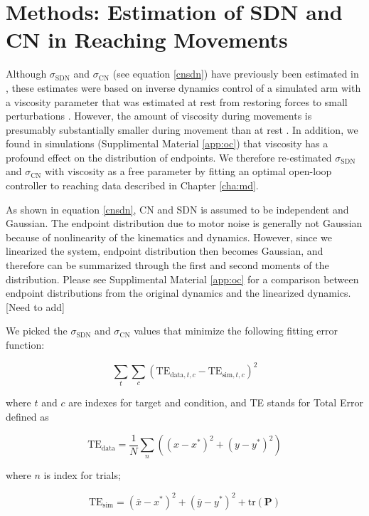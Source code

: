 \section{Methods: Estimation of SDN and CN in Reaching Movements}
Although $\sigma_{\text{SDN}}$ and $\sigma_{\text{CN}}$ (see equation \ref{cnsdn}) have previously been estimated in \cite{VanBeers2004}, these estimates were based on inverse dynamics control of a simulated arm with a viscosity parameter that was estimated at rest from restoring forces to small perturbations \cite{Gomi1998}. 
However, the amount of viscosity during movements is presumably substantially smaller during movement than at rest \cite{Burdet2013}. 
In addition, we found in simulations (Supplimental Material \ref{app:oc}) that viscosity has a profound effect on the distribution of endpoints.  
We therefore re-estimated $\sigma_{\text{SDN}}$ and $\sigma_{\text{CN}}$ with viscosity as a free parameter by fitting an optimal open-loop controller to reaching data described in Chapter \ref{cha:md}.

As shown in equation \ref{cnsdn}, CN and SDN is assumed to be independent and Gaussian. 
The endpoint distribution due to motor noise is generally not Gaussian because of nonlinearity of the kinematics and dynamics.
However, since we linearized the system, endpoint distribution then becomes Gaussian, and therefore can be summarized through the first and second moments of the distribution. 
Please see Supplimental Material \ref{app:oc} for a comparison between endpoint distributions from the original dynamics and the linearized dynamics.[Need to add]

We picked the $\sigma_{\text{SDN}}$ and $\sigma_{\text{CN}}$ values that minimize the following fitting error function:

\begin{equation}
\sum_{t}\sum_{c} (\text{TE}_{\text{data},t,c} - \text{TE}_{\text{sim},t,c})^2
\end{equation}

where $t$ and $c$ are indexes for target and condition, and TE stands for Total Error defined as 

\begin{equation}
\text{TE}_{\text{data}} = \frac1N\sum_n \left( (x - x^*)^2 + (y - y^*)^2 \right) 
\end{equation}

where $n$ is index for trials;

\begin{equation}
\text{TE}_{\text{sim}} = (\bar{x} - x^*)^2 + (\bar{y} - y^*)^2 + \text{tr}(\bm{P})
\end{equation}

